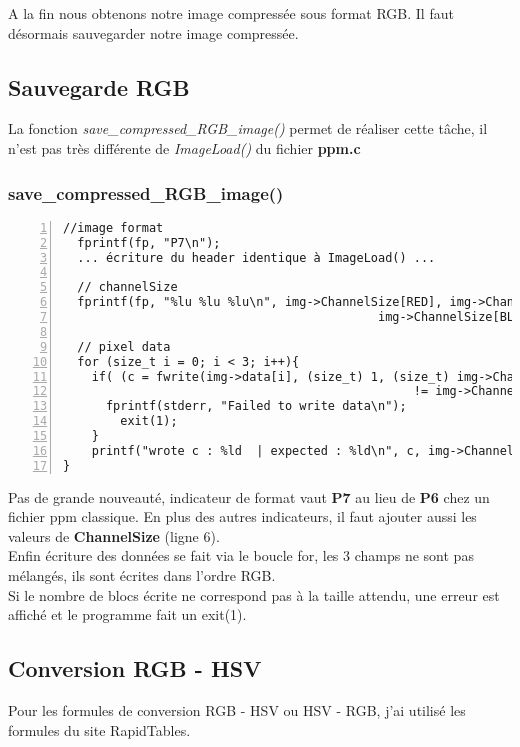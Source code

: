 \documentclass[12pt, letterpaper]{article}
\begin{document}
\break
A la fin nous obtenons notre image compressée sous format RGB. Il faut désormais sauvegarder notre image compressée. 
\subsection{Sauvegarde RGB}
La fonction \textit{save\_compressed\_RGB\_image()} permet de réaliser cette tâche, il n'est pas très différente de \textit{ImageLoad()} du fichier \textbf{ppm.c}
\subsubsection{save\_compressed\_RGB\_image()}

\begin{Verbatim}[numbers=left,xleftmargin = 5mm]
  //image format
  fprintf(fp, "P7\n");
  ... écriture du header identique à ImageLoad() ... 

  // channelSize 
  fprintf(fp, "%lu %lu %lu\n", img->ChannelSize[RED], img->ChannelSize[GREEN], 
                                            img->ChannelSize[BLUE]);
    
  // pixel data
  for (size_t i = 0; i < 3; i++){
    if( (c = fwrite(img->data[i], (size_t) 1, (size_t) img->ChannelSize[i], fp))
                                                 != img->ChannelSize[i]){
      fprintf(stderr, "Failed to write data\n");
        exit(1);
    }
    printf("wrote c : %ld  | expected : %ld\n", c, img->ChannelSize[i]);
}
\end{Verbatim}
Pas de grande nouveauté, indicateur de format vaut \textbf{P7} au lieu de 
\textbf{P6} chez un fichier ppm classique. En plus des autres indicateurs, il faut ajouter 
aussi les valeurs de \textbf{ChannelSize} (ligne 6).\\
Enfin écriture des données se fait via le boucle for, les 3 champs ne sont pas mélangés, ils sont écrites dans l'ordre RGB.\\
Si le nombre de blocs écrite ne correspond pas à la taille attendu, une erreur est affiché et le programme fait un exit(1).

\subsection{Conversion RGB - HSV}
Pour les formules de conversion RGB - HSV ou HSV - RGB, j'ai utilisé les formules du site RapidTables.
\end{document}
